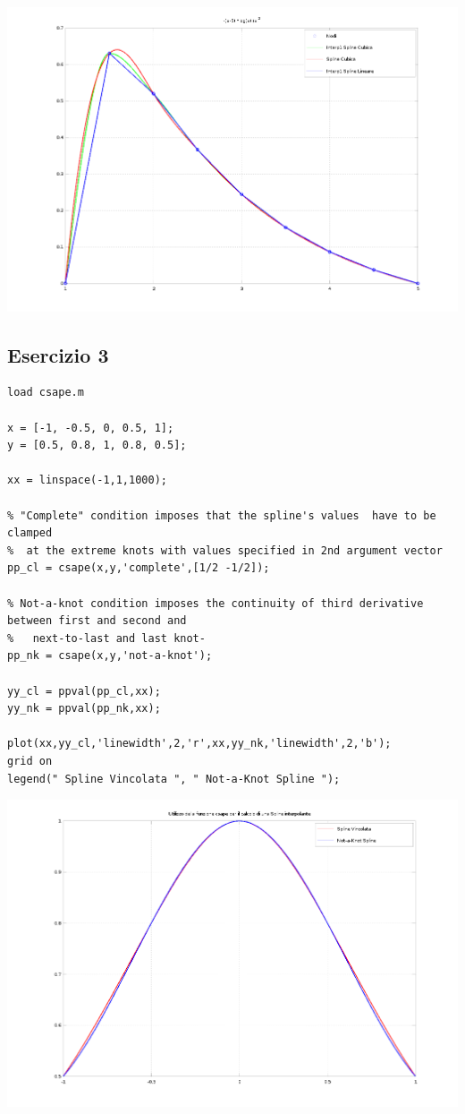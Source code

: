 \documentclass{article}
\begin{document}
\centerline{\includegraphics[scale=0.6]{ex62.png}}


\newpage
\subsection{ Esercizio 3}
\begin{lstlisting}
load csape.m

x = [-1, -0.5, 0, 0.5, 1];
y = [0.5, 0.8, 1, 0.8, 0.5];
 
xx = linspace(-1,1,1000);

% "Complete" condition imposes that the spline's values  have to be clamped 
%  at the extreme knots with values specified in 2nd argument vector
pp_cl = csape(x,y,'complete',[1/2 -1/2]);

% Not-a-knot condition imposes the continuity of third derivative between first and second and
%   next-to-last and last knot-
pp_nk = csape(x,y,'not-a-knot');

yy_cl = ppval(pp_cl,xx);
yy_nk = ppval(pp_nk,xx);

plot(xx,yy_cl,'linewidth',2,'r',xx,yy_nk,'linewidth',2,'b');
grid on
legend(" Spline Vincolata ", " Not-a-Knot Spline ");

\end{lstlisting}


\centerline{\includegraphics[scale=0.6]{ex63.png}}
\end{document}
